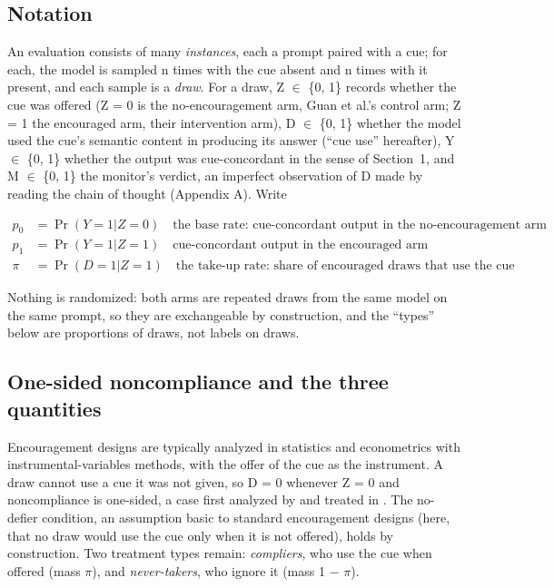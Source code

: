 \documentclass[11pt]{article}
\begin{document}
\subsection{Notation}
An evaluation consists of many \emph{instances}, each a prompt paired with a cue; for each, the model is sampled n times with the cue absent and n times with it present, and each sample is a \emph{draw}. For a draw, Z $\in$ \{0, 1\} records whether the cue was offered (Z = 0 is the no-encouragement arm, Guan et al.’s control arm; Z = 1 the encouraged arm, their intervention arm), D $\in$ \{0, 1\} whether the model used the cue’s semantic content in producing its answer (“cue use” hereafter), Y $\in$ \{0, 1\} whether the output was cue-concordant in the sense of Section~1, and M $\in$ \{0, 1\} the monitor’s verdict, an imperfect observation of D made by reading the chain of thought (Appendix A). Write

\begin{align*}
  p_0 &= \Pr(Y = 1 | Z = 0)\quad\text{the base rate: cue-concordant output in the no-encouragement arm} \\
  p_1 &= \Pr(Y = 1 | Z = 1)\quad\text{cue-concordant output in the encouraged arm} \\
  \pi  &= \Pr(D = 1 | Z = 1)\quad\text{the take-up rate: share of encouraged draws that use the cue}
\end{align*}

Nothing is randomized: both arms are repeated draws from the same model on the same prompt, so they are exchangeable by construction, and the “types” below are proportions of draws, not labels on draws.

\subsection{One-sided noncompliance and the three quantities}
Encouragement designs are typically analyzed in statistics and econometrics with instrumental-variables methods, with the offer of the cue as the instrument. A draw cannot use a cue it was not given, so D = 0 whenever Z = 0 and noncompliance is one-sided, a case first analyzed by \citet{bloom1984accounting} and treated in \citet[ch. 23]{imbens2015causal}. The no-defier condition, an assumption basic to standard encouragement designs (here, that no draw would use the cue only when it is not offered), holds by construction. Two treatment types remain: \emph{compliers}, who use the cue when offered (mass $\pi$), and \emph{never-takers}, who ignore it (mass 1 $-$ $\pi$).
\end{document}
